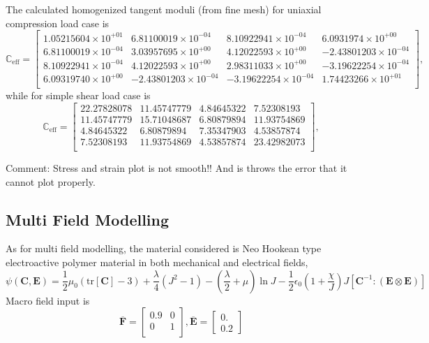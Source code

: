 The calculated homogenized tangent moduli (from fine mesh) for uniaxial compression load case is 
\begin{equation}
\mathbb{C}_{\text{eff}} = 
\begin{bmatrix}
1.05215604 \times 10^{+01} &  6.81100019\times 10^{-04}  & 8.10922941\times 10^{-04} & 6.0931974\times 10^{+00} \\
6.81100019\times 10^{-04} &  3.03957695\times 10^{+00} &  4.12022593\times 10^{+00} & -2.43801203\times 10^{-04}\\
8.10922941\times 10^{-04} &  4.12022593\times 10^{+00} &  2.98311033\times 10^{+00} & -3.19622254\times 10^{-04}\\
6.09319740\times 10^{+00} & -2.43801203\times 10^{-04} & -3.19622254\times 10^{-04} &  1.74423266\times 10^{+01}\\
\end{bmatrix},
\end{equation}
while for simple shear load case is 
\begin{equation}
\mathbb{C}_{\text{eff}} = 
\begin{bmatrix}
22.27828078 & 11.45747779 &  4.84645322 &  7.52308193 \\
11.45747779 & 15.71048687 &  6.80879894 & 11.93754869 \\
4.84645322 &  6.80879894  & 7.35347903 &  4.53857874 \\
7.52308193 & 11.93754869 &  4.53857874 & 23.42982073 \\
\end{bmatrix},
\end{equation}

Comment: Stress and strain plot is not smooth!! And is throws the error that it cannot plot properly.


\subsection{Multi Field Modelling}
As for multi field modelling, the material considered is Neo Hookean type electroactive polymer material in both mechanical and electrical fields, 
\begin{equation}
\label{eq: nhk}
\psi\left( \mathbf{C}, \mathbf{E} \right) =  \frac{1}{2}\mu_{0} \left( \text{tr}[\mathbf{C}]-3 \right) + \dfrac{\lambda}{4} \left( J^{2}-1 \right) - \left( \dfrac{\lambda}{2} + \mu \right) \ln J - \frac{1}{2} \epsilon_{0} \left( 1+\dfrac{\chi}{J} \right) J \left[ \mathbf{C}^{-1}: (\mathbf{E} \otimes \mathbf{E}) \right]
\end{equation}
Macro field input is 
\[
\overbar{\mathbf{F}} = 
\begin{bmatrix}
0.9 & 0 \\
0 & 1 \\
\end{bmatrix},
\overbar{\mathbf{E}} = 
\begin{bmatrix}
0. \\
0.2
\end{bmatrix}
\]


